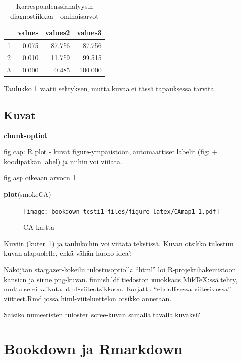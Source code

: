 \documentclass[finnish,]{book}
\newenvironment{Shaded}{\begin{snugshade}}{\end{snugshade}}
\newcommand{\KeywordTok}[1]{\textcolor[rgb]{0.13,0.29,0.53}{\textbf{#1}}}
\newcommand{\NormalTok}[1]{#1}
\theoremstyle{definition}
\theoremstyle{definition}
\theoremstyle{definition}
\theoremstyle{remark}
\begin{document}
\begin{table}

\caption{\label{tab:simpleCAscree}Korrespondenssianalyysin diagnostiikkaa - ominaisarvot}
\centering
\begin{tabular}[t]{rrrr}
\toprule
 & values & values2 & values3\\
\midrule
1 & 0.075 & 87.756 & 87.756\\
2 & 0.010 & 11.759 & 99.515\\
3 & 0.000 & 0.485 & 100.000\\
\bottomrule
\end{tabular}
\end{table}

Taulukko \ref{tab:simpleCAscree} vaatii selityksen, mutta kuvaa ei tässä
tapauksessa tarvita.

\hypertarget{kuvat}{%
\section{Kuvat}\label{kuvat}}

\textbf{chunk-optiot}

fig.cap: R plot - kuvat figure-ympäristöön, automaattiset labelit (fig:
+ koodipätkän label) ja niihin voi viitata.

fig.asp oikeaan arvoon 1.

\begin{Shaded}
\begin{Highlighting}[]
\KeywordTok{plot}\NormalTok{(smokeCA)}
\end{Highlighting}
\end{Shaded}

\begin{figure}
\centering
\texttt{[image: bookdown-testi1\_files/figure-latex/CAmap1-1.pdf]}
\caption{\label{fig:CAmap1}CA-kartta}
\end{figure}

Kuviin (kuten \ref{fig:CAmap1}) ja taulukoihin voi viitata tekstissä.
Kuvan otsikko tulostuu kuvan alapuolelle, ehkä vähän huono idea?

Näköjään stargazer-kokeilu tulostusoptiolla ``html'' loi
R-projektihakemistoon kansion ja sinne png-kuvan. finnish.ldf tiedoston
muokkaus MikTeX:ssä tehty, mutta se ei vaikuta html-viiteotsikkoon.
Korjattu ``ehdollisessa viitesivussa'' viitteet.Rmd jossa
html-viiteluettelon otsikko annetaan.

Saisiko numeeristen tulosten scree-kuvan samalla tavalla kuvaksi?

\hypertarget{bookdown-ja-rmarkdown}{%
\chapter{Bookdown ja Rmarkdown}\label{bookdown-ja-rmarkdown}}
\end{document}
